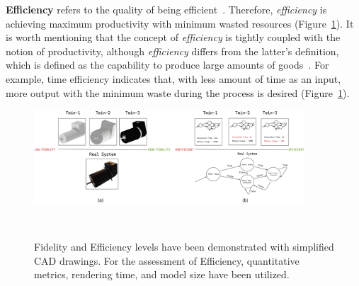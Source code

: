 \documentclass{llncs}
\begin{document}
    \textbf{Efficiency} refers to the quality of being efficient~\cite{OxfordDictionary}. 
    Therefore, \textit{efficiency} is achieving maximum productivity with minimum wasted resources (Figure~\ref{fig:EfficiencyandFidelity}). 
    It is worth mentioning that the concept of \textit{efficiency} is tightly coupled with the notion of productivity, 
    although \textit{efficiency} differs from the latter's definition, which is defined as the capability to produce large amounts of goods~\cite{OxfordDictionary}.  
    For example, time efficiency indicates that,  with less amount of time as an input, more output with the minimum waste during the process is desired (Figure~\ref{fig:EfficiencyandFidelity}).
    \begin{figure}[htbp]
        \centering
        \includegraphics[width = 0.9\textwidth]{Efficiency and Fidelity.png}
        \caption{Fidelity and Efficiency levels have been demonstrated with simplified CAD drawings. For the assessment of 
        Efficiency, quantitative metrics, rendering time, and model size have been utilized.}~\label{fig:EfficiencyandFidelity}
    \end{figure}
\end{document}
